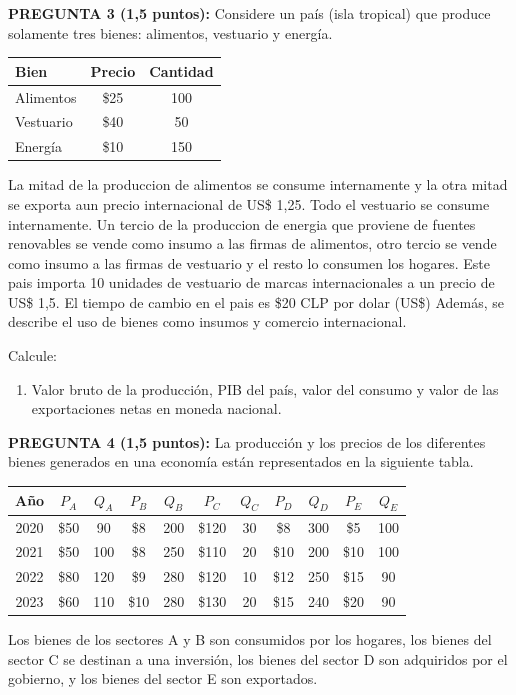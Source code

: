 \documentclass[11pt,addpoints]{article}
\begin{document}
\textbf{PREGUNTA 3 (1,5 puntos):}  
Considere un país (isla tropical) que produce solamente tres bienes: alimentos, vestuario y energía.  
\begin{center}
\begin{tabular}{lcc}
\toprule
\textbf{Bien} & \textbf{Precio} & \textbf{Cantidad} \\
\midrule
Alimentos & \$25 & 100 \\
Vestuario & \$40 & 50 \\
Energía   & \$10 & 150 \\
\bottomrule
\end{tabular}
\end{center}
La mitad de la produccion de alimentos se consume internamente y la otra mitad se exporta aun precio internacional de US\$ 1,25. Todo el vestuario se consume internamente. Un tercio de la produccion de energia que proviene de fuentes renovables se vende como insumo a las firmas de alimentos, otro tercio se vende como insumo a las firmas de vestuario y el resto lo consumen los hogares. Este pais importa 10 unidades de vestuario de marcas internacionales a un precio de US\$ 1,5. El tiempo de cambio en el pais es \$20 CLP por dolar (US\$)
Además, se describe el uso de bienes como insumos y comercio internacional.  
\vspace*{0.3cm}

Calcule:
\begin{enumerate}[label=\alph*)]
    \item Valor bruto de la producción, PIB del país, valor del consumo y valor de las exportaciones netas en moneda nacional.
\end{enumerate}



\textbf{PREGUNTA 4 (1,5 puntos):}  
La producción y los precios de los diferentes bienes generados en una economía están representados en la siguiente tabla.

\begin{center}
\begin{tabular}{c c c c c c c c c c c}
\toprule
\textbf{Año} & $P_A$ & $Q_A$ & $P_B$ & $Q_B$ & $P_C$ & $Q_C$ & $P_D$ & $Q_D$ & $P_E$ & $Q_E$ \\
\midrule
2020 & \$50 & 90  & \$8  & 200 & \$120 & 30 & \$8  & 300 & \$5  & 100 \\
2021 & \$50 & 100 & \$8  & 250 & \$110 & 20 & \$10 & 200 & \$10 & 100 \\
2022 & \$80 & 120 & \$9  & 280 & \$120 & 10 & \$12 & 250 & \$15 & 90  \\
2023 & \$60 & 110 & \$10 & 280 & \$130 & 20 & \$15 & 240 & \$20 & 90  \\
\bottomrule
\end{tabular}
\end{center}
\newpage
\vspace*{0.1cm}
Los bienes de los sectores A y B son consumidos por los hogares, los bienes del sector C se destinan a una inversión, los bienes del sector D son adquiridos por el gobierno, y los bienes del sector E son exportados.
\end{document}
